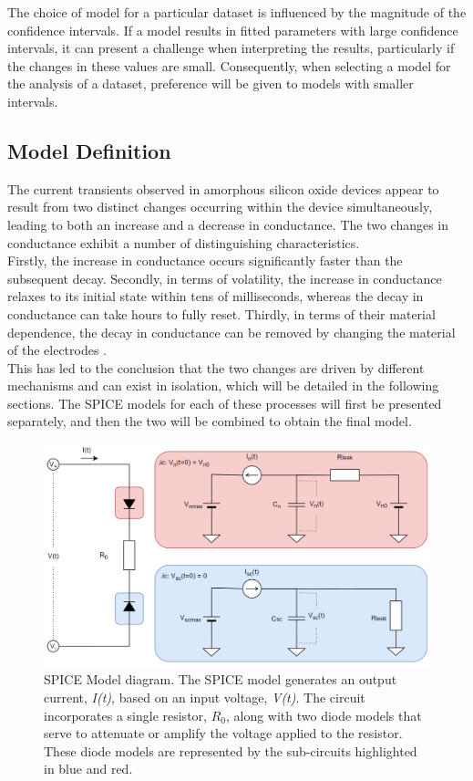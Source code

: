 \noindent The choice of model for a particular dataset is influenced by the magnitude of the confidence intervals. If a model results in fitted parameters with large confidence intervals, it can present a challenge when interpreting the results, particularly if the changes in these values are small. Consequently, when selecting a model for the analysis of a dataset, preference will be given to models with smaller intervals.


\subsection[Model Definition]{Model Definition}

The current transients observed in amorphous silicon oxide devices appear to result from two distinct changes occurring within the device simultaneously, leading to both an increase and a decrease in conductance. The two changes in conductance exhibit a number of distinguishing characteristics. \\

\noindent Firstly, the increase in conductance occurs significantly faster than the subsequent decay. Secondly, in terms of volatility, the increase in conductance relaxes to its initial state within tens of milliseconds, whereas the decay in conductance can take hours to fully reset. Thirdly, in terms of their material dependence, the decay in conductance can be removed by changing the material of the electrodes \cite{mannion2022current}. \\

\noindent This has led to the conclusion that the two changes are driven by different mechanisms and can exist in isolation, which will be detailed in the following sections. The SPICE models for each of these processes will first be presented separately, and then the two will be combined to obtain the final model.

\begin{figure}[htbp!] 
    \centering    
    \includegraphics[width=1\textwidth]{Chapter5/Figs/d.png}
    \caption[SPICE Model diagram.]{SPICE Model diagram. The SPICE model generates an output current, \textit{I(t)}, based on an input voltage, \textit{V(t)}. The circuit incorporates a single resistor, $R_0$, along with two diode models that serve to attenuate or amplify the voltage applied to the resistor. These diode models are represented by the sub-circuits highlighted in blue and red.}
    \label{fig:5d}
\end{figure}


